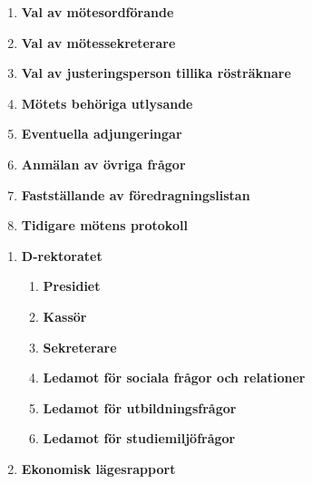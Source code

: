 \documentclass{protokoll}
\begin{document}
\begin{motesfakta} %
  \narvarande
\end{motesfakta}




  \begin{enumerate}
    \item\textbf{Val av mötesordförande}
    \item\textbf{Val av mötessekreterare}
    \item\textbf{Val av justeringsperson tillika rösträknare}
    \item\textbf{Mötets behöriga utlysande}
    \item\textbf{Eventuella adjungeringar}
    \item\textbf{Anmälan av övriga frågor}
    \item\textbf{Fastställande av föredragningslistan}
    \item\textbf{Tidigare mötens protokoll}
  \end{enumerate}


  \begin{enumerate}
    \item \textbf{D-rektoratet}
      \begin{enumerate}
        \item \textbf{Presidiet}
        \item \textbf{Kassör}
        \item \textbf{Sekreterare}
        \item \textbf{Ledamot för sociala frågor och relationer}
        \item \textbf{Ledamot för utbildningsfrågor}
        \item \textbf{Ledamot för studiemiljöfrågor}
      \end{enumerate}
    \item \textbf{Ekonomisk lägesrapport}
  \end{enumerate}
\end{document}
